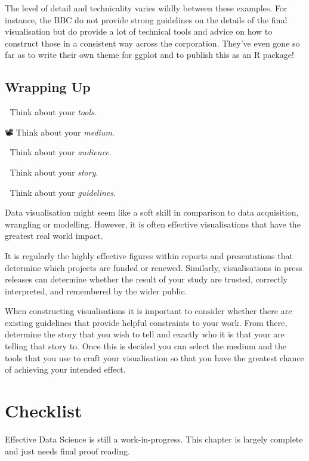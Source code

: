 \documentclass[
  12pt,
]{book}
\begin{document}
The level of detail and technicality varies wildly between these examples. For instance, the BBC do not provide strong guidelines on the details of the final visualisation but do provide a lot of technical tools and advice on how to construct those in a consistent way across the corporation. They've even gone so far as to write their own theme for ggplot and to publish this as an R package!

\hypertarget{wrapping-up-4}{%
\section{Wrapping Up}\label{wrapping-up-4}}

🔨 Think about your \emph{tools}.

📽 Think about your \emph{medium}.

👥 Think about your \emph{audience}.

📖 Think about your \emph{story}.

📝 Think about your \emph{guidelines}.

Data visualisation might seem like a soft skill in comparison to data acquisition, wrangling or modelling. However, it is often effective visualisations that have the greatest real world impact.

It is regularly the highly effective figures within reports and presentations that determine which projects are funded or renewed. Similarly, visualisations in press releases can determine whether the result of your study are trusted, correctly interpreted, and remembered by the wider public.

When constructing visualisations it is important to consider whether there are existing guidelines that provide helpful constraints to your work. From there, determine the story that you wish to tell and exactly who it is that your are telling that story to. Once this is decided you can select the medium and the tools that you use to craft your visualisation so that you have the greatest chance of achieving your intended effect.

\hypertarget{edav-checklist}{%
\chapter*{Checklist}\label{edav-checklist}}

Effective Data Science is still a work-in-progress. This chapter is largely complete and just needs final proof reading.
\end{document}
